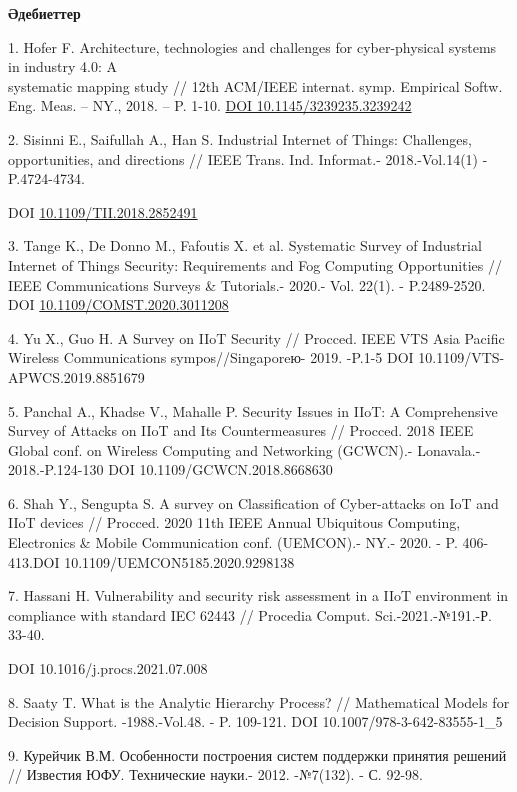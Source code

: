 \begin{center}
{\bfseries Әдебиеттер}
\end{center}

\begin{references}
1. Hofer F. Architecture, technologies and challenges for cyber-physical
systems in industry 4.0: A \\systematic mapping study // 12th ACM/IEEE
internat. symp. Empirical Softw. Eng. Meas. -- NY., 2018. -- P. 1-10.
\href{https://doi.org/10.1145/3239235.3239242}{DOI
10.1145/3239235.3239242}

2. Sisinni E., Saifullah A., Han S. Industrial Internet of Things:
Challenges, opportunities, and directions // IEEE Trans. Ind. Informat.-
2018.-Vol.14(1) - P.4724-4734.

DOI
\href{https://doi.org/10.1109/TII.2018.2852491}{10.1109/TII.2018.2852491}

3. Tange K., De Donno M., Fafoutis X. et al. Systematic Survey of
Industrial Internet of Things Security: Requirements and Fog Computing
Opportunities // IEEE Communications Surveys \& Tutorials.- 2020.- Vol.
22(1). - P.2489-2520. DOI
\href{http://dx.doi.org/10.1109/COMST.2020.3011208}{10.1109/COMST.2020.3011208}

4. Yu X., Guo H. A Survey on IIoT Security // Procced. IEEE VTS Asia
Pacific Wireless Communications sympos//Singaporeю- 2019. -P.1-5 DOI
10.1109/VTS-APWCS.2019.8851679

5. Panchal A., Khadse V., Mahalle P. Security Issues in IIoT: A
Comprehensive Survey of Attacks on IIoT and Its Countermeasures //
Procced. 2018 IEEE Global conf. on Wireless Computing and Networking
(GCWCN).- Lonavala.- 2018.-P.124-130 DOI 10.1109/GCWCN.2018.8668630

6. Shah Y., Sengupta S. A survey on Classification of Cyber-attacks on
IoT and IIoT devices // Procced. 2020 11th IEEE Annual Ubiquitous
Computing, Electronics \& Mobile Communication conf. (UEMCON).- NY.-
2020. - P. 406-413.DOI 10.1109/UEMCON5185.2020.9298138

7. Hassani H. Vulnerability and security risk assessment in a IIoT
environment in compliance with standard IEC 62443 // Procedia Comput.
Sci.-2021.-№191.-Р. 33-40.

DOI 10.1016/j.procs.2021.07.008

8. Saaty T. What is the Analytic Hierarchy Process? // Mathematical
Models for Decision Support. -1988.-Vol.48. - P. 109-121. DOI
10.1007/978-3-642-83555-1\_5

9. Курейчик В.М. Особенности построения систем поддержки принятия
решений // Известия ЮФУ. Технические науки.- 2012. -№7(132). - С. 92-98.


\end{references}
